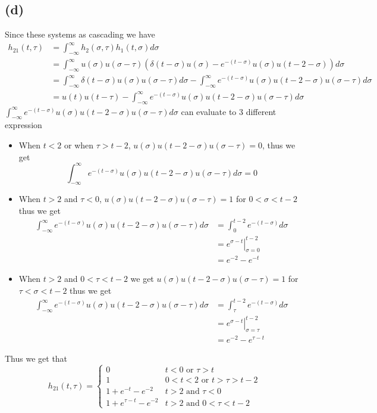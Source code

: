 \documentclass[12pt]{article}
\begin{document}
\subsection*{(d)}
Since these systems as cascading we have
\begin{align*}
h_{21}(t,\tau)&=\int_{-\infty}^{\infty}h_2(\sigma,\tau)h_1(t,\sigma)d\sigma\\
&=\int_{-\infty}^{\infty}u(\sigma)u(\sigma-\tau)(\delta(t-\sigma)u(\sigma)-e^{-(t-\sigma)}u(\sigma)u(t-2-\sigma))d\sigma\\
&=\int_{-\infty}^{\infty}\delta(t-\sigma)u(\sigma)u(\sigma-\tau)d\sigma-\int_{-\infty}^{\infty}e^{-(t-\sigma)}u(\sigma)u(t-2-\sigma)u(\sigma-\tau)d\sigma\\
&=u(t)u(t-\tau)-\int_{-\infty}^{\infty}e^{-(t-\sigma)}u(\sigma)u(t-2-\sigma)u(\sigma-\tau)d\sigma
\end{align*}
$\int_{-\infty}^{\infty}e^{-(t-\sigma)}u(\sigma)u(t-2-\sigma)u(\sigma-\tau)d\sigma$ can evaluate to 3 different expression
\begin{itemize}
\item When $t<2$ or when $\tau>t-2$, $u(\sigma)u(t-2-\sigma)u(\sigma-\tau)=0$, thus we get
$$\int_{-\infty}^{\infty}e^{-(t-\sigma)}u(\sigma)u(t-2-\sigma)u(\sigma-\tau)d\sigma=0$$
\item When $t>2$ and $\tau<0$, $u(\sigma)u(t-2-\sigma)u(\sigma-\tau)=1$ for $0<\sigma<t-2$ thus we get
\begin{align*}
\int_{-\infty}^{\infty}e^{-(t-\sigma)}u(\sigma)u(t-2-\sigma)u(\sigma-\tau)d\sigma&=\int_{0}^{t-2}e^{-(t-\sigma)}d\sigma\\
&=\left.e^{\sigma-t}\right|_{\sigma=0}^{t-2}\\
&=e^{-2}-e^{-t}
\end{align*}
\item When $t>2$ and $0<\tau<t-2$ we get $u(\sigma)u(t-2-\sigma)u(\sigma-\tau)=1$ for $\tau<\sigma<t-2$ thus we get
\begin{align*}
\int_{-\infty}^{\infty}e^{-(t-\sigma)}u(\sigma)u(t-2-\sigma)u(\sigma-\tau)d\sigma&=\int_{\tau}^{t-2}e^{-(t-\sigma)}d\sigma\\
&=\left.e^{\sigma-t}\right|_{\sigma=\tau}^{t-2}\\
&=e^{-2}-e^{\tau-t}
\end{align*}
\end{itemize}

Thus we get that
$$h_{21}(t,\tau)=\boxed{\begin{cases}
0 & t<0 \text{ or } \tau>t\\
1 & 0<t<2 \text{ or } t>\tau>t-2\\
1+e^{-t}-e^{-2} & t>2 \text{ and } \tau<0\\
1+e^{\tau-t}-e^{-2} & t>2 \text{ and } 0<\tau<t-2
\end{cases}}$$
\pagebreak
\end{document}
